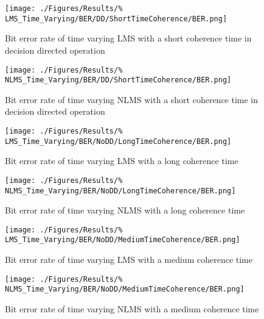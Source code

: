 \begin{figure}[ht]
	\centering
	\begin{minipage}{0.49\textwidth}
		\centering
		\texttt{[image: ./Figures/Results/\%
	LMS\_Time\_Varying/BER/DD/ShortTimeCoherence/BER.png]}
		\captionsetup{width=0.75\linewidth}
		\caption{Bit error rate of time varying LMS with a 
		short coherence time in decision directed operation}
	\end{minipage}
	\begin{minipage}{0.49\textwidth}
		\centering
		\texttt{[image: ./Figures/Results/\%
	NLMS\_Time\_Varying/BER/DD/ShortTimeCoherence/BER.png]}
		\captionsetup{width=0.75\linewidth}
		\caption{Bit error rate of time varying NLMS with a 
		short coherence time in decision directed operation}
	\end{minipage}
\end{figure}

\begin{figure}[ht]
	\centering
	\begin{minipage}{0.49\textwidth}
		\centering
		\texttt{[image: ./Figures/Results/\%
	LMS\_Time\_Varying/BER/NoDD/LongTimeCoherence/BER.png]}
		\captionsetup{width=0.75\linewidth}
		\caption{Bit error rate of time varying LMS with a 
		long coherence time}
	\end{minipage}
	\begin{minipage}{0.49\textwidth}
		\centering
		\texttt{[image: ./Figures/Results/\%
	NLMS\_Time\_Varying/BER/NoDD/LongTimeCoherence/BER.png]}
		\captionsetup{width=0.75\linewidth}
		\caption{Bit error rate of time varying NLMS with a 
		long coherence time}
	\end{minipage}
\end{figure}

\begin{figure}[ht]
	\centering
	\begin{minipage}{0.49\textwidth}
		\centering
		\texttt{[image: ./Figures/Results/\%
	LMS\_Time\_Varying/BER/NoDD/MediumTimeCoherence/BER.png]}
		\captionsetup{width=0.75\linewidth}
		\caption{Bit error rate of time varying LMS with a 
		medium coherence time}
	\end{minipage}
	\begin{minipage}{0.49\textwidth}
		\centering
		\texttt{[image: ./Figures/Results/\%
	NLMS\_Time\_Varying/BER/NoDD/MediumTimeCoherence/BER.png]}
		\captionsetup{width=0.75\linewidth}
		\caption{Bit error rate of time varying NLMS with a 
		medium coherence time}
	\end{minipage}
\end{figure}

